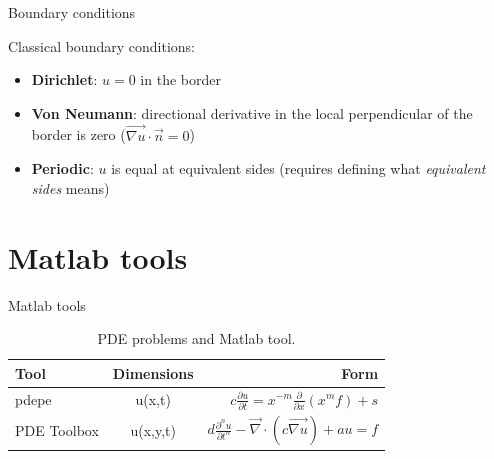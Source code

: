 \documentclass{beamer}
\begin{document}
  \begin{frame}{Boundary conditions}

    Classical boundary conditions:

    \begin{itemize}
    \item \textbf{Dirichlet}: $u = 0$ in the border
    \pause
    \item \textbf{Von Neumann}: directional derivative in the local perpendicular of the border is zero ($\vec{\nabla u} \cdot \vec n = 0$)
    \pause
    \item \textbf{Periodic}: $u$ is equal at equivalent sides (requires defining what \textit{equivalent sides} means)
    \end{itemize}

  \end{frame}

\section{Matlab tools}

  \begin{frame}{Matlab tools}
  
    \begin{table}
    \centering
    \begin{tabular}{l|c|r}
    Tool & Dimensions & Form \\\hline
    pdepe & u(x,t) & $c \frac{\partial u}{\partial t} = x^{-m} \frac{\partial}{\partial x}(x^m f) + s$\\
    PDE Toolbox & u(x,y,t) & $d \frac{\partial^n u}{\partial t^n} - \vec \nabla \cdot (c \vec{\nabla u}) + a u= f$
    \end{tabular}
    \caption{\label{tab:MatlabTools}PDE problems and Matlab tool.}
    \end{table}
  
  \end{frame}
  
\end{document}

